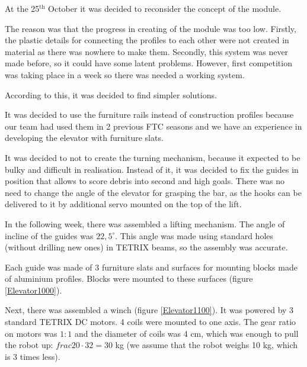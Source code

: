 \begin{enumerate*}
  \item At the 25$^\text{th}$ October it was decided to reconsider the concept of the module.

  The reason was that the progress in creating of the module was too low. Firstly, the plastic details for connecting the profiles to each other were not created in material as there was nowhere to make them. Secondly, this system was never made before, so it could have some latent problems. However, first competition was taking place in a week so there was needed a working system.

  According to this, it was decided to find simpler solutions.
  \begin{enumerate*}
  	
  	\item It was decided to use the furniture rails instead of construction profiles because our team had used them in 2 previous FTC seasons and we have an experience in developing the elevator with furniture slats.
  	
  	\item It was decided to not to create the turning mechanism, because it expected to be bulky and difficult in realisation. Instead of it, it was decided to fix the guides in position that allows to score debris into second and high goals. There was no need to change the angle of the elevator for grasping the bar, as the hooks can be delivered to it by additional servo mounted on the top of the lift.
  	
  \end{enumerate*}

  \item In the following week, there was assembled a lifting mechanism. The angle of incline of the guides was $22,5^\circ$. This angle was made using standard holes (without drilling new ones) in TETRIX beams, so the assembly was accurate.

  Each guide was made of 3 furniture slats and surfaces for mounting blocks made of aluminium profiles. Blocks were mounted to these surfaces (figure \ref{Elevator1000}).

  Next, there was assembled a winch (figure \ref{Elevator1100}). It was powered by 3 standard TETRIX DC motors. 4 coils were mounted to one axis. The gear ratio on motors was $1:1$ and the diameter of coils was 4 cm, which was enough to pull the robot up: $frac{20 \cdot 3}{2} = 30$ kg (we assume that the robot weighs 10 kg, which is 3 times less).
  

\end{enumerate*}
